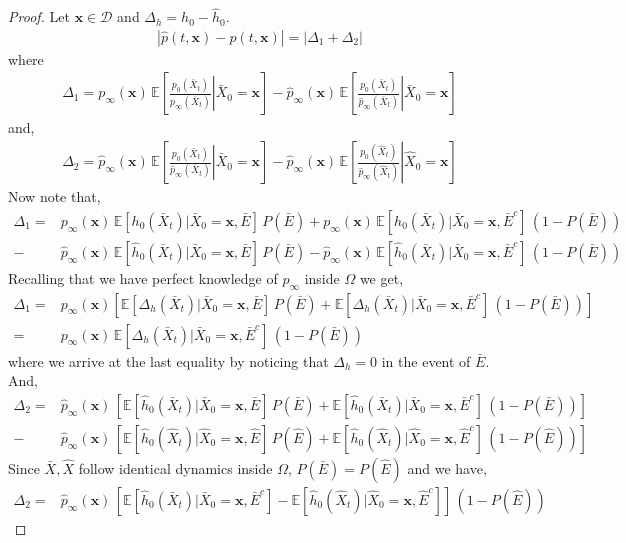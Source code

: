 \begin{proof}
Let $\mathbf x\in\mathcal D$ and $\Delta_h = h_0-\hat h_0$.
    \begin{align}
    |\hat p(t, \mathbf x)-p(t, \mathbf x)| = |\Delta_1+\Delta_2|    
    \end{align}
where
\begin{align}
    \Delta_1 =  p_\infty(\mathbf x)\,\mathbb E\left[\left.\frac{p_0(\bar{X}_t)}{{p}_\infty(\bar{X}_t)}\right\vert \bar{X}_0=\mathbf x\right]-\hat p_\infty(\mathbf x)\,\mathbb E\left[\left.\frac{p_0(\bar{X}_t)}{\hat{p}_\infty(\bar{X}_t)}\right\vert \bar{X}_0=\mathbf x\right]
\end{align}
and,
\begin{align}
    \Delta_2 = \hat p_\infty(\mathbf x)\,\mathbb E\left[\left.\frac{p_0(\bar{X}_t)}{\hat{p}_\infty(\bar{X}_t)}\right\vert \bar{X}_0=\mathbf x\right]-\hat p_\infty(\mathbf x)\,\mathbb E\left[\left.\frac{p_0(\hat{X}_t)}{\hat{p}_\infty(\hat{X}_t)}\right\vert \hat{X}_0=\mathbf x\right]
\end{align}
Now note that, 
\begin{align}
    \Delta_1 = &p_\infty(\mathbf x)\,\mathbb E[h_0(\bar X_t)|\bar X_0=\mathbf x, \bar E]\,P(\bar E)+p_\infty(\mathbf x)\,\mathbb E[h_0(\bar X_t)|\bar X_0=\mathbf x, \bar E^c]\,(1-P(\bar E))\\
    -&\hat p_\infty(\mathbf x)\,\mathbb E[\hat h_0(\bar X_t)|\bar X_0=\mathbf x, \bar E]\,P(\bar E)-\hat p_\infty(\mathbf x)\,\mathbb E[\hat h_0(\bar X_t)|\bar X_0=\mathbf x, \bar E^c]\,(1-P(\bar E))
\end{align}
Recalling that we have perfect knowledge of $p_\infty$ inside $\Omega$ we get,
\begin{align}
    \Delta_1=&p_\infty(\mathbf x)\left[\mathbb E[\Delta_h(\bar X_t)|\bar X_0=\mathbf x, \bar E]\,P(\bar E)+\mathbb E[\Delta_h(\bar X_t)|\bar X_0=\mathbf x, \bar E^c]\,(1-P(\bar E))\right]\\
    =&p_\infty(\mathbf x)\,\mathbb E[\Delta_h(\bar X_t)|\bar X_0=\mathbf x, \bar E^c]\,(1-P(\bar E))
\end{align}
where we arrive at the last equality by noticing that $\Delta_h=0$ in the event of $\bar E$.
And,
\begin{align}
    \Delta_2 = &\hat p_\infty(\mathbf x)\,[\mathbb E[\hat h_0(\bar X_t)|\bar X_0=\mathbf x, \bar E]\,P(\bar E)+\mathbb E[\hat h_0(\bar X_t)|\bar X_0=\mathbf x, \bar E^c]\,(1-P(\bar E))]\\
    -&\hat p_\infty(\mathbf x)\,[\mathbb E[\hat h_0(\hat X_t)|\hat X_0=\mathbf x, \hat E]\,P(\hat E)+\mathbb E[\hat h_0(\hat X_t)|\hat X_0=\mathbf x, \hat E^c]\,(1-P(\hat E))]
\end{align}
  Since $\bar X, \hat X$ follow identical dynamics inside $\Omega$, $P(\bar E)=P(\hat E)$ and we have,
\begin{align}
    \Delta_2 = &\hat p_\infty(\mathbf x)\,[\mathbb E[\hat h_0(\bar X_t)|\bar X_0=\mathbf x, \bar E^c]-\mathbb E[\hat h_0(\hat X_t)|\hat X_0=\mathbf x, \hat E^c]]\,(1-P(\hat E))
\end{align}
\end{proof}
